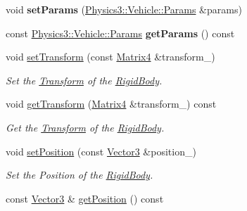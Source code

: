 \begin{DoxyCompactItemize}
\item 
void {\bfseries set\+Params} (\hyperlink{class_i_dream_sky_1_1_physics3_1_1_vehicle_1_1_params}{Physics3\+::\+Vehicle\+::\+Params} \&params)\hypertarget{class_i_dream_sky_1_1_physics3_1_1_vehicle_a68906411b6cd18b31c6c9d8bbcb2069e}{}\label{class_i_dream_sky_1_1_physics3_1_1_vehicle_a68906411b6cd18b31c6c9d8bbcb2069e}

\item 
const \hyperlink{class_i_dream_sky_1_1_physics3_1_1_vehicle_1_1_params}{Physics3\+::\+Vehicle\+::\+Params} {\bfseries get\+Params} () const \hypertarget{class_i_dream_sky_1_1_physics3_1_1_vehicle_a86ef079c2c7beaeec68e2a78d9a28c59}{}\label{class_i_dream_sky_1_1_physics3_1_1_vehicle_a86ef079c2c7beaeec68e2a78d9a28c59}

\item 
void \hyperlink{class_i_dream_sky_1_1_physics3_1_1_vehicle_a91442ec4d9cc561010be809abba1a79d}{set\+Transform} (const \hyperlink{class_i_dream_sky_1_1_matrix4}{Matrix4} \&transform\+\_\+)
\begin{DoxyCompactList}\small\item\em Set the \hyperlink{class_i_dream_sky_1_1_transform}{Transform} of the \hyperlink{class_i_dream_sky_1_1_physics3_1_1_rigid_body}{Rigid\+Body}. \end{DoxyCompactList}\item 
void \hyperlink{class_i_dream_sky_1_1_physics3_1_1_vehicle_a0ce85263d5c43b4bd0f66b024a82ae2c}{get\+Transform} (\hyperlink{class_i_dream_sky_1_1_matrix4}{Matrix4} \&transform\+\_\+) const 
\begin{DoxyCompactList}\small\item\em Get the \hyperlink{class_i_dream_sky_1_1_transform}{Transform} of the \hyperlink{class_i_dream_sky_1_1_physics3_1_1_rigid_body}{Rigid\+Body}. \end{DoxyCompactList}\item 
void \hyperlink{class_i_dream_sky_1_1_physics3_1_1_vehicle_a7f6723274fa446982c16563f0e705a57}{set\+Position} (const \hyperlink{class_i_dream_sky_1_1_vector3}{Vector3} \&position\+\_\+)
\begin{DoxyCompactList}\small\item\em Set the Position of the \hyperlink{class_i_dream_sky_1_1_physics3_1_1_rigid_body}{Rigid\+Body}. \end{DoxyCompactList}\item 
const \hyperlink{class_i_dream_sky_1_1_vector3}{Vector3} \& \hyperlink{class_i_dream_sky_1_1_physics3_1_1_vehicle_aa682bb8fe3bb6cd9fa8a12a26633eab4}{get\+Position} () const 

\end{DoxyCompactItemize}
